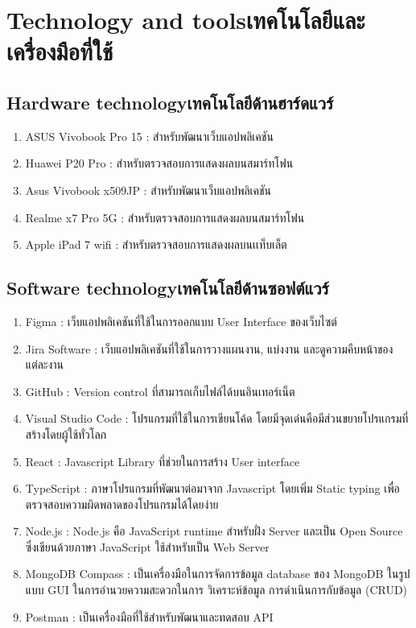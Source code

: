 \section{\ifenglish Technology and tools\else เทคโนโลยีและเครื่องมือที่ใช้\fi}

\subsection{\ifenglish Hardware technology\else เทคโนโลยีด้านฮาร์ดแวร์\fi}
\begin{enumerate}
    \item ASUS Vivobook Pro 15 : สำหรับพัฒนาเว็บแอปพลิเคชัน
    \item Huawei P20 Pro : สำหรับตรวจสอบการแสดงผลบนสมาร์ทโฟน
    \item Asus Vivobook x509JP : สำหรับพัฒนาเว็บแอปพลิเคชัน
    \item Realme x7 Pro 5G : สำหรับตรวจสอบการแสดงผลบนสมาร์ทโฟน
    \item Apple iPad 7 wifi : สำหรับตรวจสอบการแสดงผลบนเเท็บเล็ต
\end{enumerate}
\subsection{\ifenglish Software technology\else เทคโนโลยีด้านซอฟต์แวร์\fi}
\begin{enumerate}
    \item Figma : เว็บแอปพลิเคชันที่ใช้ในการออกแบบ User Interface ของเว็บไซต์
    \item Jira Software : เว็บแอปพลิเคชันที่ใช้ในการวางแผนงาน, แบ่งงาน และดูความคืบหน้าของแต่ละงาน
    \item GitHub : Version control ที่สามารถเก็บไฟล์ได้บนอินเทอร์เน็ต
    \item Visual Studio Code : โปรแกรมที่ใช้ในการเขียนโค้ด โดยมีจุดเด่นคือมีส่วนขยายโปรแกรมที่สร้างโดยผู้ใช้ทั่วโลก
    \item React : Javascript Library ที่ช่วยในการสร้าง User interface
    \item TypeScript : ภาษาโปรแกรมที่พัฒนาต่อมาจาก Javascript โดยเพิ่ม Static typing เพื่อตรวจสอบความผิดพลาดของโปรแกรมได้โดยง่าย
    \item Node.js : Node.js คือ JavaScript runtime สำหรับฝั่ง Server และเป็น Open Source ซึ่งเขียนด้วยภาษา JavaScript ใช้สำหรับเป็น Web Server
    \item MongoDB Compass : เป็นเครื่องมือในการจัดการข้อมูล database ของ MongoDB ในรูปแบบ GUI ในการอํานวยความสะดวกในการ วิเคราะห์ข้อมูล การดําเนินการกับข้อมูล (CRUD)
    \item Postman : เป็นเครื่องมือที่ใช้สำหรับพัฒนาและทดสอบ API 
\end{enumerate}
